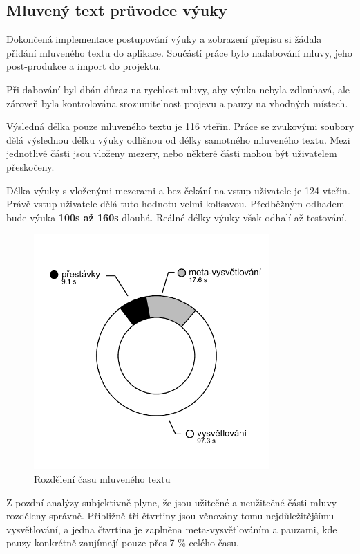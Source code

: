 \subsection{Mluvený text průvodce
výuky}\label{mluvenuxfd-text-prux16fvodce-vuxfduky}

Dokončená implementace postupování výuky a zobrazení přepisu si žádala
přidání mluveného textu do aplikace. Součástí práce bylo nadabování
mluvy, jeho post-produkce a import do projektu.

Při dabování byl dbán důraz na rychlost mluvy, aby výuka nebyla
zdlouhavá, ale zároveň byla kontrolována srozumitelnost projevu a pauzy
na vhodných místech.

Výsledná délka pouze mluveného textu je 116 vteřin. Práce se zvukovými
soubory dělá výslednou délku výuky odlišnou od délky samotného mluveného
textu. Mezi jednotlivé části jsou vloženy mezery, nebo některé části
mohou být uživatelem přeskočeny. 

Délka výuky s vloženými mezerami a bez
čekání na vstup uživatele je 124 vteřin. Právě vstup uživatele dělá tuto
hodnotu velmi kolísavou. Předběžným odhadem bude výuka \textbf{100s až
160s} dlouhá. Reálné délky výuky však odhalí až testování.

\begin{figure}[h!]
\centering
\includegraphics[height=9cm]{src/assets/time-chart.pdf}
\caption{Rozdělení času mluveného textu}
\end{figure}

Z pozdní analýzy subjektivně plyne, že jsou užitečné a neužitečné
části mluvy rozděleny správně. Přibližně tři čtvrtiny jsou věnovány
tomu nejdůležitějšímu -- vysvětlování, a jedna čtvrtina je zaplněna
meta-vysvětlováním a pauzami, kde pauzy konkrétně zaujímají pouze přes 7
\% celého času.

